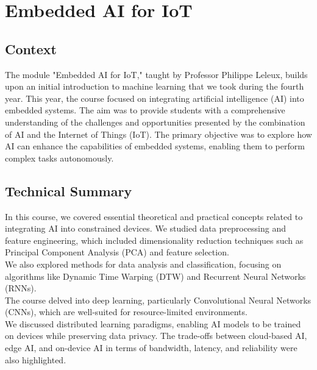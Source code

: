 
\section{Embedded AI for IoT}
\subsection{Context}
\indent \indent The module "Embedded AI for IoT," taught by Professor Philippe Leleux, builds upon an initial introduction to machine learning that we took during the fourth year. 
This year, the course focused on integrating artificial intelligence (AI) into embedded systems. 
The aim was to provide students with a comprehensive understanding of the challenges and opportunities presented by the combination of AI and the Internet of Things (IoT).
The primary objective was to explore how AI can enhance the capabilities of embedded systems, enabling them to perform complex tasks autonomously.

\subsection{Technical Summary}
\indent \indent In this course, we covered essential theoretical and practical concepts related to integrating AI into constrained devices. 
We studied data preprocessing and feature engineering, which included dimensionality reduction techniques such as Principal Component Analysis (PCA) and feature selection. \\
We also explored methods for data analysis and classification, focusing on algorithms like Dynamic Time Warping (DTW) and Recurrent Neural Networks (RNNs). \\
The course delved into deep learning, particularly Convolutional Neural Networks (CNNs), which are well-suited for resource-limited environments. \\
We discussed distributed learning paradigms, enabling AI models to be trained on devices while preserving data privacy. 
The trade-offs between cloud-based AI, edge AI, and on-device AI in terms of bandwidth, latency, and reliability were also highlighted.

